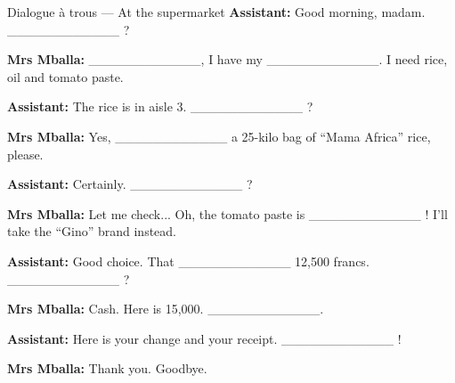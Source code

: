 \documentclass[11pt]{article}
\begin{document}
\begin{textebox}{Dialogue à trous — At the supermarket}
\textbf{Assistant:} Good morning, madam. \_\_\_\_\_\_\_\_\_\_\_\_ ?

\textbf{Mrs Mballa:} \_\_\_\_\_\_\_\_\_\_\_\_, I have my \_\_\_\_\_\_\_\_\_\_\_\_. I need rice, oil and tomato paste.

\textbf{Assistant:} The rice is in aisle 3. \_\_\_\_\_\_\_\_\_\_\_\_ ?

\textbf{Mrs Mballa:} Yes, \_\_\_\_\_\_\_\_\_\_\_\_ a 25-kilo bag of “Mama Africa” rice, please.

\textbf{Assistant:} Certainly. \_\_\_\_\_\_\_\_\_\_\_\_ ?

\textbf{Mrs Mballa:} Let me check... Oh, the tomato paste is \_\_\_\_\_\_\_\_\_\_\_\_ ! I'll take the “Gino” brand instead.

\textbf{Assistant:} Good choice. That \_\_\_\_\_\_\_\_\_\_\_\_ 12,500 francs. \_\_\_\_\_\_\_\_\_\_\_\_ ?

\textbf{Mrs Mballa:} Cash. Here is 15,000. \_\_\_\_\_\_\_\_\_\_\_\_.

\textbf{Assistant:} Here is your change and your receipt. \_\_\_\_\_\_\_\_\_\_\_\_ !

\textbf{Mrs Mballa:} Thank you. Goodbye.
\end{textebox}
\end{document}
